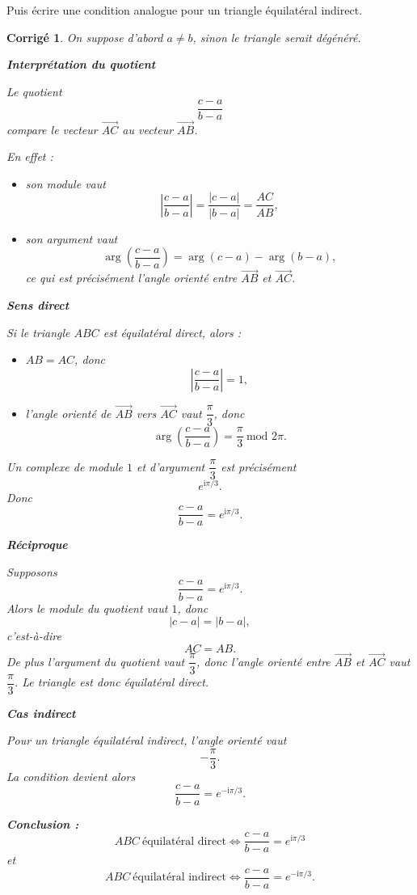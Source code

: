 \documentclass[11pt,a4paper]{article}
\newtheorem*{corrige}{Corrigé}
\newcommand{\ii}{\mathrm{i}}
\begin{document}
Puis écrire une condition analogue pour un triangle équilatéral indirect.

\begin{corrige}
On suppose d'abord \(a\neq b\), sinon le triangle serait dégénéré.

\textbf{Interprétation du quotient}

Le quotient
\[
\frac{c-a}{b-a}
\]
compare le vecteur \(\overrightarrow{AC}\) au vecteur \(\overrightarrow{AB}\).

En effet :
\begin{itemize}
    \item son module vaut
    \[
    \left|\frac{c-a}{b-a}\right|=\frac{|c-a|}{|b-a|}=\frac{AC}{AB},
    \]
    \item son argument vaut
    \[
    \arg\left(\frac{c-a}{b-a}\right)=\arg(c-a)-\arg(b-a),
    \]
    ce qui est précisément l'angle orienté entre \(\overrightarrow{AB}\) et \(\overrightarrow{AC}\).
\end{itemize}

\textbf{Sens direct}

Si le triangle \(ABC\) est équilatéral direct, alors :
\begin{itemize}
    \item \(AB=AC\), donc
    \[
    \left|\frac{c-a}{b-a}\right|=1,
    \]
    \item l'angle orienté de \(\overrightarrow{AB}\) vers \(\overrightarrow{AC}\) vaut \(\dfrac{\pi}{3}\), donc
    \[
    \arg\left(\frac{c-a}{b-a}\right)=\frac{\pi}{3}\ \text{mod }2\pi.
    \]
\end{itemize}
Un complexe de module \(1\) et d'argument \(\dfrac{\pi}{3}\) est précisément
\[
e^{\ii\pi/3}.
\]
Donc
\[
\frac{c-a}{b-a}=e^{\ii\pi/3}.
\]

\textbf{Réciproque}

Supposons
\[
\frac{c-a}{b-a}=e^{\ii\pi/3}.
\]
Alors le module du quotient vaut \(1\), donc
\[
|c-a|=|b-a|,
\]
c'est-à-dire
\[
AC=AB.
\]
De plus l'argument du quotient vaut \(\dfrac{\pi}{3}\), donc l'angle orienté entre \(\overrightarrow{AB}\) et \(\overrightarrow{AC}\) vaut \(\dfrac{\pi}{3}\). Le triangle est donc équilatéral direct.

\textbf{Cas indirect}

Pour un triangle équilatéral indirect, l'angle orienté vaut
\[
-\frac{\pi}{3}.
\]
La condition devient alors
\[
\boxed{\frac{c-a}{b-a}=e^{-\ii\pi/3}}.
\]

\textbf{Conclusion :}
\[
\boxed{ABC\ \text{équilatéral direct} \iff \frac{c-a}{b-a}=e^{\ii\pi/3}}
\]
et
\[
\boxed{ABC\ \text{équilatéral indirect} \iff \frac{c-a}{b-a}=e^{-\ii\pi/3}}.
\]
\end{corrige}
\end{document}
